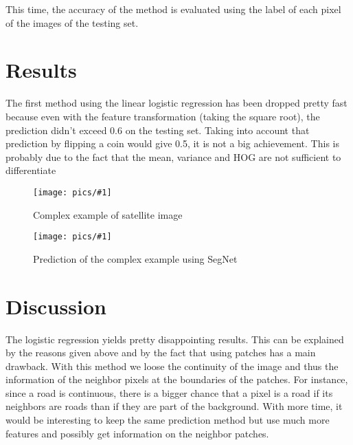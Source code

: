 \documentclass[10pt,conference,compsocconf]{IEEEtran}
\newcommand{\scalefig}[4]{
  \begin{figure}[ht!]
    \centering
    \texttt{[image: pics/\#1]}
 \caption{#3}
    \label{#4}
  \end{figure}}
\begin{document}
This time, the accuracy of the method is evaluated using the label of each pixel of the images of the testing set.

\section{Results}
The first method  using the linear logistic regression has been dropped pretty fast because even with the feature transformation (taking the square root), the prediction didn't exceed 0.6 on the testing set. Taking into account that prediction by flipping a coin would give 0.5, it is not a big achievement. This is probably due to the fact that the mean, variance and HOG are not sufficient to differentiate 
\scalefig{pred}{0.9}{Complex example of satellite image}{fig:pred}
\scalefig{pred_label}{0.8}{Prediction of the complex example using SegNet}{fig:pred_label}


\section{Discussion}
The logistic regression yields pretty disappointing results. This can be explained by the reasons given above and by the fact that using patches has a main drawback. With this method we loose the continuity of the image and thus the information of the neighbor pixels at the boundaries of the patches. For instance, since a road is continuous, there is a bigger chance that a pixel is a road if its neighbors are roads than if they are part of the background. With more time, it would be interesting to keep the same prediction method but use much more features and possibly get information on the neighbor patches.\\
\end{document}
